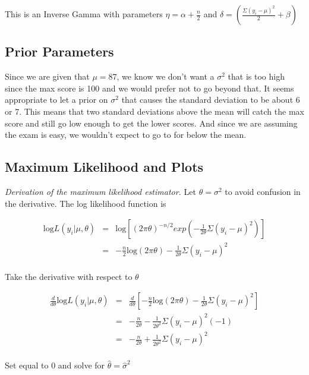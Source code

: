 \documentclass[12pt]{article}
\begin{document}
\noindent This is an Inverse Gamma with parameters $\eta=\alpha+\frac{n}{2}$ and $\delta=\left(\frac{\Sigma(y_i-\mu)^2}{2}+\beta\right)$

\subsection{Prior Parameters}

\noindent Since we are given that $\mu=87$, we know we don't want a $\sigma^2$ that is too high since the max score is 100 and we would prefer not to go beyond that.  It seems appropriate to let a prior on $\sigma^2$ that causes the standard deviation to be about 6 or 7.  This means that two standard deviations above the mean will catch the max score and still go low enough to get the lower scores.  And since we are assuming the exam is easy, we wouldn't expect to go to for below the mean.

\subsection{Maximum Likelihood and Plots}

\noindent \textit{Derivation of the maximum likelihood estimator.}  Let $\theta=\sigma^2$ to avoid confusion in the derivative.  The log likelihood function is

\begin{eqnarray*}
\mathrm{log}L(y_i|\mu,\theta) &=& \mathrm{log}\left[(2\pi\theta)^{-n/2}exp\left(-\frac{1}{2\theta}\Sigma(y_i-\mu)^2\right)\right] \\
&=& -\frac{n}{2}\mathrm{log}(2\pi\theta)-\frac{1}{2\theta}\Sigma(y_i-\mu)^2 \\
\end{eqnarray*}

\noindent Take the derivative with respect to $\theta$

\begin{eqnarray*}
\frac{d}{d\theta}\mathrm{log}L(y_i|\mu,\theta) &=& \frac{d}{d\theta}\left[-\frac{n}{2}\mathrm{log}(2\pi\theta)-\frac{1}{2\theta}\Sigma(y_i-\mu)^2\right] \\
&=& -\frac{n}{2\theta}-\frac{1}{2\theta^2}\Sigma(y_i-\mu)^2(-1) \\
&=& -\frac{n}{2\theta}+\frac{1}{2\theta^2}\Sigma(y_i-\mu)^2 \\
\end{eqnarray*}

\noindent Set equal to 0 and solve for $\hat{\theta}=\hat{\sigma}^2$
\end{document}
